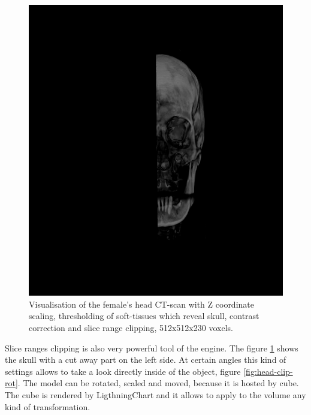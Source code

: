 \documentclass[twoside, english, 11pt]{report}
\begin{document}
\begin{figure}[H]
\centerline{\includegraphics[scale = 0.45]{img/head-clip}}
\caption{Visualisation of the female's head CT-scan with Z coordinate scaling, thresholding of soft-tissues which reveal skull, contrast correction and slice range clipping, 512x512x230 voxels.\label{fig:head-clip}}
\end{figure}

Slice ranges clipping is also very powerful tool of the engine. The figure \ref{fig:head-clip} shows the skull with a cut away part on the left side. At certain angles this kind of settings allows to take a look directly inside of the object, figure \ref{fig:head-clip-rot}. The model can be rotated, scaled and moved, because it is hosted by cube. The cube is rendered by LigthningChart and it allows to apply to the volume any kind of transformation.\\
\end{document}
